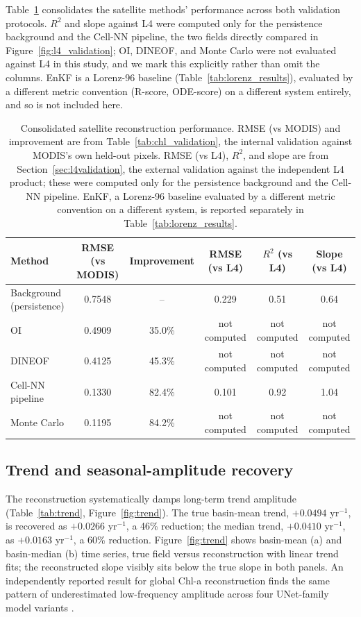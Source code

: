 \documentclass[final,5p,times,twocolumn,authoryear]{elsarticle}
\begin{document}
Table~\ref{tab:master_metrics} consolidates the satellite methods'
performance across both validation protocols. $R^2$ and slope
against L4 were computed only for the persistence background and the
Cell-NN pipeline, the two fields directly compared in
Figure~\ref{fig:l4_validation}; OI, DINEOF, and Monte Carlo were not
evaluated against L4 in this study, and we mark this explicitly
rather than omit the columns. EnKF is a Lorenz-96 baseline
(Table~\ref{tab:lorenz_results}), evaluated by a different metric
convention (R-score, ODE-score) on a different system entirely, and
so is not included here.

\begin{table}[t]
\centering
\caption{Consolidated satellite reconstruction performance. RMSE (vs
MODIS) and improvement are from Table~\ref{tab:chl_validation}, the
internal validation against MODIS's own held-out pixels. RMSE (vs
L4), $R^2$, and slope are from Section~\ref{sec:l4validation}, the
external validation against the independent L4 product; these were
computed only for the persistence background and the Cell-NN
pipeline. EnKF, a Lorenz-96 baseline evaluated by a different metric
convention on a different system, is reported separately in
Table~\ref{tab:lorenz_results}.}
\label{tab:master_metrics}
\begin{tabular}{lccccc}
\toprule
Method & RMSE (vs MODIS) & Improvement & RMSE (vs L4) & $R^2$ (vs L4) & Slope (vs L4) \\
\midrule
Background (persistence) & 0.7548 & -- & 0.229 & 0.51 & 0.64 \\
OI                       & 0.4909 & 35.0\% & not computed & not computed & not computed \\
DINEOF                   & 0.4125 & 45.3\% & not computed & not computed & not computed \\
Cell-NN pipeline         & 0.1330 & 82.4\% & 0.101 & 0.92 & 1.04 \\
Monte Carlo              & 0.1195 & 84.2\% & not computed & not computed & not computed \\
\bottomrule
\end{tabular}
\end{table}

\subsection{Trend and seasonal-amplitude recovery}
\label{sec:trend}

The reconstruction systematically damps long-term trend amplitude
(Table~\ref{tab:trend}, Figure~\ref{fig:trend}). The true basin-mean
trend, $+0.0494$ yr$^{-1}$, is recovered as $+0.0266$ yr$^{-1}$, a
46\% reduction; the median trend, $+0.0410$ yr$^{-1}$, as $+0.0163$
yr$^{-1}$, a 60\% reduction. Figure~\ref{fig:trend} shows basin-mean
(a) and basin-median (b) time series, true field versus reconstruction
with linear trend fits; the reconstructed slope visibly sits below
the true slope in both panels. An independently reported result for
global Chl-a reconstruction finds the same pattern of underestimated
low-frequency amplitude across four UNet-family model variants
\citep{martinez2020frontiers}.
\end{document}
